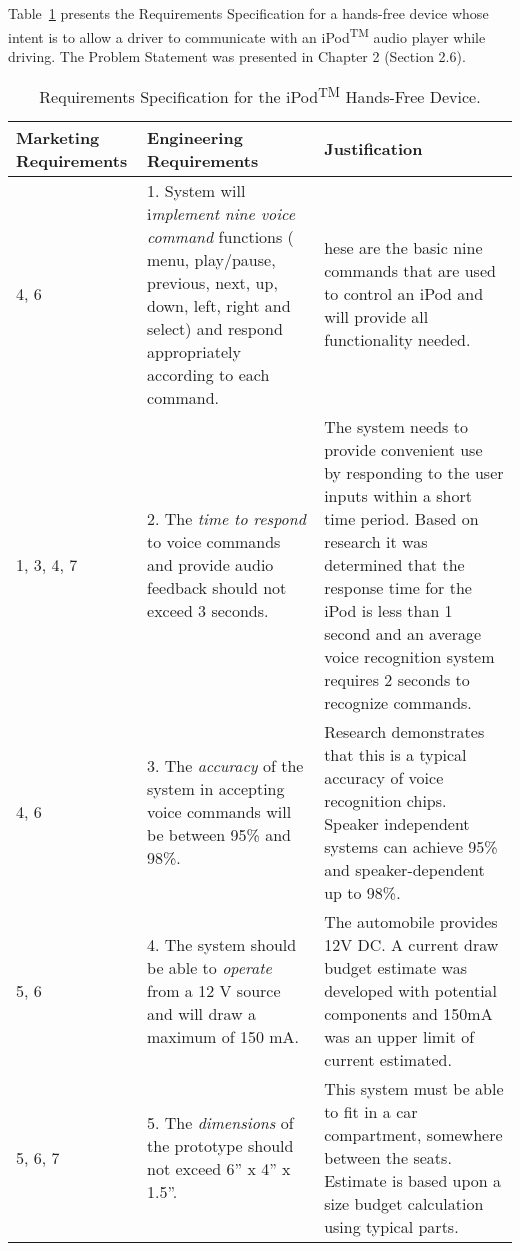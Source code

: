 Table~\ref{table:ipod} presents the Requirements Specification for a hands-free
device whose intent is to allow a driver to communicate with an
iPod\textsuperscript{TM} audio player while driving. The Problem
Statement was presented in Chapter 2 (Section 2.6).

\begin{table}
\centering
\caption{Requirements Specification for the
iPod\textsuperscript{TM} Hands-Free Device.}
\label{table:ipod}

\begin{tabular}{ |p{2cm}|p{5cm}|p{5cm}|} 
\hline
\rowcolor{Gray}
\textbf{Marketing Requirements} & \textbf{Engineering Requirements} & \textbf{Justification} \\ \hline

4, 6 & 
1.  System will i\emph{mplement nine voice command} functions ( menu,
  play/pause, previous, next, up, down, left, right and select) and
  respond appropriately according to each command. &
  hese are the basic nine commands that are used to
control an iPod and will provide all functionality needed. \\ \hline

1, 3, 4, 7 & 
2.   The \emph{time to respond} to voice commands and provide audio
  feedback should not exceed 3 seconds. &
The system needs to provide convenient use by
responding to the user inputs within a short time period. Based on
research it was determined that the response time for the iPod is less
than 1 second and an average voice recognition system requires 2 seconds
to recognize commands. \\ \hline

4, 6 & 
3.   The \emph{accuracy} of the system in accepting voice commands will be
  between 95\% and 98\%. &
Research demonstrates that this is a typical accuracy
of voice recognition chips. Speaker independent systems can achieve 95\%
and speaker-dependent up to 98\%. \\ \hline

5, 6 & 
4.   The system should be able to \emph{operate} from a 12 V source and
  will draw a maximum of 150 mA. &
The automobile provides 12V DC. A current draw budget
estimate was developed with potential components and 150mA was an upper
limit of current estimated. \\ \hline

5, 6, 7 & 
5.  The \emph{dimensions} of the prototype should not exceed 6'' x 4'' x  1.5''. &
This system must be able to fit in a car compartment,
somewhere between the seats. Estimate is based upon a size budget
calculation using typical parts. \\ \hline


\end{tabular}
\end{table}
